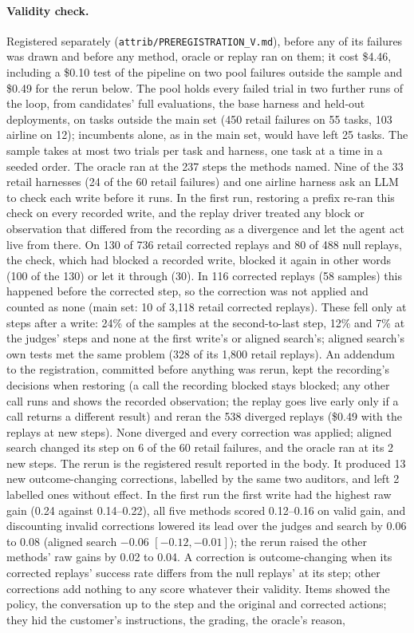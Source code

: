 \documentclass[11pt]{article}
\begin{document}
\paragraph{Validity check.} Registered separately (\texttt{attrib/PREREGISTRATION\_V.md}), before any of its failures was drawn and before any method, oracle or replay ran on them; it cost \$4.46, including a \$0.10 test of the pipeline on two pool failures outside the sample and \$0.49 for the rerun below. The pool holds every failed trial in two further runs of the loop, from candidates' full evaluations, the base harness and held-out deployments, on tasks outside the main set (450 retail failures on 55 tasks, 103 airline on 12); incumbents alone, as in the main set, would have left 25 tasks. The sample takes at most two trials per task and harness, one task at a time in a seeded order. The oracle ran at the 237 steps the methods named. Nine of the 33 retail harnesses (24 of the 60 retail failures) and one airline harness ask an LLM to check each write before it runs. In the first run, restoring a prefix re-ran this check on every recorded write, and the replay driver treated any block or observation that differed from the recording as a divergence and let the agent act live from there. On 130 of 736 retail corrected replays and 80 of 488 null replays, the check, which had blocked a recorded write, blocked it again in other words (100 of the 130) or let it through (30). In 116 corrected replays (58 samples) this happened before the corrected step, so the correction was not applied and counted as none (main set: 10 of 3{,}118 retail corrected replays). These fell only at steps after a write: 24\% of the samples at the second-to-last step, 12\% and 7\% at the judges' steps and none at the first write's or aligned search's; aligned search's own tests met the same problem (328 of its 1{,}800 retail replays). An addendum to the registration, committed before anything was rerun, kept the recording's decisions when restoring (a call the recording blocked stays blocked; any other call runs and shows the recorded observation; the replay goes live early only if a call returns a different result) and reran the 538 diverged replays (\$0.49 with the replays at new steps). None diverged and every correction was applied; aligned search changed its step on 6 of the 60 retail failures, and the oracle ran at its 2 new steps. The rerun is the registered result reported in the body. It produced 13 new outcome-changing corrections, labelled by the same two auditors, and left 2 labelled ones without effect. In the first run the first write had the highest raw gain (0.24 against 0.14--0.22), all five methods scored 0.12--0.16 on valid gain, and discounting invalid corrections lowered its lead over the judges and search by 0.06 to 0.08 (aligned search $-0.06$ $[-0.12,-0.01]$); the rerun raised the other methods' raw gains by 0.02 to 0.04. A correction is outcome-changing when its corrected replays' success rate differs from the null replays' at its step; other corrections add nothing to any score whatever their validity. Items showed the policy, the conversation up to the step and the original and corrected actions; they hid the customer's instructions, the grading, the oracle's reason, 
\end{document}
